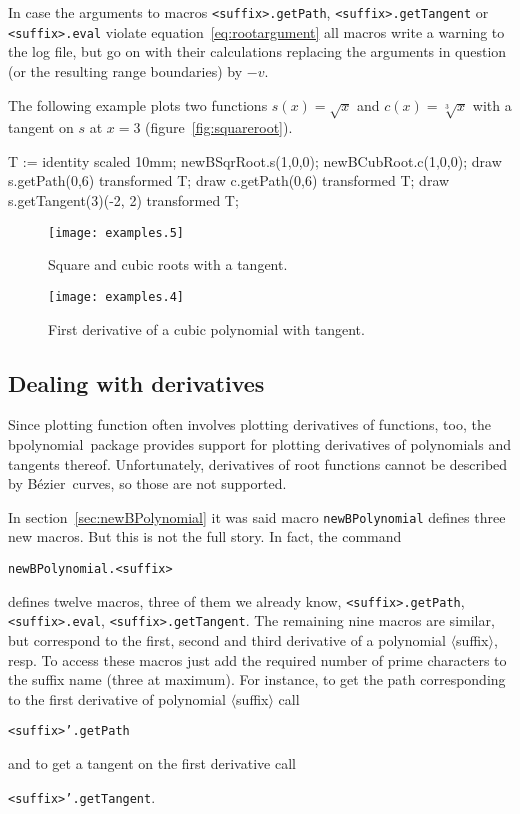 \documentclass{article}
\newcommand*{\cmd}[1]{\texttt{#1}}
\newcommand*{\name}[1]{\textsf{#1}}
\newcommand*{\pkg}{\name{bpolynomial}}
\newcommand*{\B}{B\'ezier}
\begin{document}
In case the arguments to macros \cmd{<suffix>.getPath}, \cmd{<suffix>.getTangent} or \cmd{<suffix>.eval} violate equation~\ref{eq:rootargument} all macros write a warning to the log file, but go on with their calculations replacing the arguments in question (or the resulting range boundaries) by $-v$.

The following example plots two functions $s(x) = \sqrt{x}$ and $c(x) = \sqrt[3]{x}$ with a tangent on $s$ at $x=3$ (figure~\ref{fig:squareroot}).
\begin{listing}
  T := identity scaled 10mm;
  newBSqrRoot.s(1,0,0);
  newBCubRoot.c(1,0,0);
  draw s.getPath(0,6) transformed T;
  draw c.getPath(0,6) transformed T;
  draw s.getTangent(3)(-2, 2) transformed T;
\end{listing}

\begin{figure}
  \begin{minipage}[t]{.55\linewidth}
    \centering
    \texttt{[image: examples.5]}
    \caption{Square and cubic roots with a tangent.}
    \label{fig:squareroot}
  \end{minipage}\hfill%
  \begin{minipage}[t]{.4\linewidth}
    \centering
    \texttt{[image: examples.4]}
    \caption{First derivative of a cubic polynomial with tangent.}
    \label{fig:derivative}
  \end{minipage}
\end{figure}

\subsection{Dealing with derivatives}\label{sec:derivatives}
Since plotting function often involves plotting derivatives of functions, too, the \pkg\ package provides support for plotting derivatives of polynomials and tangents thereof.  Unfortunately, derivatives of root functions cannot be described by \B\ curves, so those are not supported.

In section~\ref{sec:newBPolynomial} it was said macro \cmd{newBPolynomial} defines three new macros.  But this is not the full story.  In fact, the command
\begin{center}
  \cmd{newBPolynomial.<suffix>}
\end{center}
defines twelve macros, three of them we already know, \cmd{<suffix>.getPath}, \cmd{<suffix>.eval}, \cmd{<suffix>.getTangent}.  The remaining nine macros are similar, but correspond to the first, second and third derivative of a polynomial $\langle$suffix$\rangle$, resp.  To access these macros just add the required number of prime characters to the suffix name (three at maximum).  For instance, to get the path corresponding to the first derivative of polynomial $\langle$suffix$\rangle$ call
\begin{center}
  \cmd{<suffix>'.getPath}
\end{center}
and to get a tangent on the first derivative call
\begin{center}
  \cmd{<suffix>'.getTangent}.
\end{center}
\end{document}
